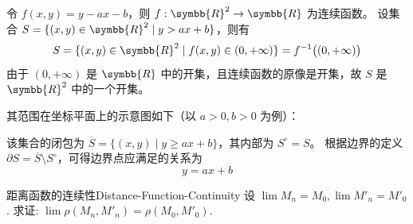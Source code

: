 \begin{myproof}
    令 $f(x, y) = y - ax - b$，则 $f: \symbb{R}^2 \to \symbb{R}$ 为连续函数。
    设集合 $S = \{ (x, y) \in \symbb{R}^2 \mid y > ax + b \}$，则有
    \begin{equation*}
        S = \{ (x, y) \in \symbb{R}^2 \mid f(x, y) \in (0, +\infty) \} = f^{-1}\bigl( (0, +\infty) \bigr)
    \end{equation*}
    由于 $(0, +\infty)$ 是 $\symbb{R}$ 中的开集，且连续函数的原像是开集，故 $S$ 是 $\symbb{R}^2$ 中的一个开集。

    其范围在坐标平面上的示意图如下（以 $a > 0, b > 0$ 为例）：
    \begin{center}
    \end{center}

    该集合的闭包为 $\overline{S} = \{ (x, y) \mid y \ge ax + b \}$，其内部为 $S^\circ = S$。
    根据边界的定义 $\partial S = \overline{S} \setminus S^\circ$，可得边界点应满足的关系为
    \begin{equation*}
        \boxed{y = ax + b}
    \end{equation*}
\end{myproof}


\begin{problem}{距离函数的连续性}{Distance-Function-Continuity}
    设 $\lim M_n = M_0, \lim M'_n = M'_0$. 求证: $\lim \rho(M_n, M'_n) = \rho(M_0, M'_0)$.
\end{problem}

